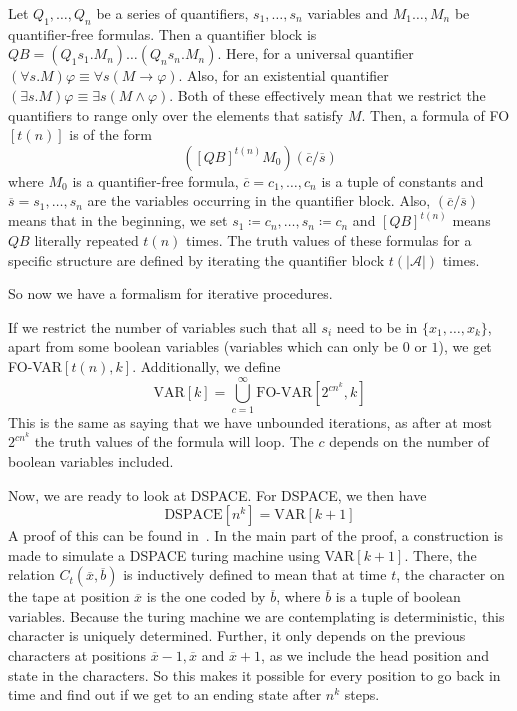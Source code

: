 \begin{define}[{FO$[t(n)]$}]
    Let $Q_1, \dots, Q_n$ be a series of quantifiers, $s_1, \dots, s_n$ variables and $M_1 \dots, M_n$ be quantifier-free formulas.
    Then a quantifier block is $QB = (Q_{1}s_{1}.M_{n})\dots(Q_{n}s_{n}.M_{n})$.
    Here, for a universal quantifier $(\forall s.M)\varphi \equiv \forall s (M \to \varphi)$.
    Also, for an existential quantifier $(\exists s.M)\varphi \equiv \exists s(M \land \varphi)$.
    Both of these effectively mean that we restrict the quantifiers to range only over the elements that satisfy $M$.
    Then, a formula of FO$[t(n)]$ is of the form
    \[
        \left([QB]^{t(n)}M_{0}\right)(\overline{c} / \overline{s})
    \]
    where $M_0$ is a quantifier-free formula, $\overline{c} = c_1, \dots, c_n$ is a tuple of constants and $\overline{s} = s_1, \dots, s_n$ are the variables occurring in the quantifier block.
    Also, $(\overline{c} / \overline{s})$ means that in the beginning, we set $s_1 \coloneqq c_n, \dots, s_n \coloneqq c_n$ and $[QB]^{t(n)}$ means $QB$ literally repeated $t(n)$ times.
    The truth values of these formulas for a specific structure are defined by iterating the quantifier block $t(|\mathcal{A}|)$ times.
\end{define}
So now we have a formalism for iterative procedures.

If we restrict the number of variables such that all $s_i$ need to be in $\{x_1, \dots, x_k \}$, apart from some boolean variables (variables which can only be $0$ or $1$), we get FO-VAR$[t(n), k]$.
Additionally, we define
\[
    \text{VAR}[k] = \bigcup_{c = 1}^{\infty}\text{FO-VAR}[2^{cn^k}, k]
\]
This is the same as saying that we have unbounded iterations, as after at most $2^{cn^k}$ the truth values of the formula will loop.
The $c$ depends on the number of boolean variables included.

Now, we are ready to look at DSPACE\@.
For DSPACE, we then have
\[
    \text{DSPACE}[n^k] = \text{VAR}[k + 1]
\]
A proof of this can be found in~\cite{descriptive-complexity}.
In the main part of the proof, a construction is made to simulate a DSPACE turing machine using VAR$[k + 1]$.
There, the relation $C_{t}(\overline{x}, \overline{b})$ is inductively defined to mean that at time $t$, the character on the tape at position $\overline{x}$ is the one coded by $\overline{b}$, where $\overline{b}$ is a tuple of boolean variables.
Because the turing machine we are contemplating is deterministic, this character is uniquely determined.
Further, it only depends on the previous characters at positions $\overline{x} - 1, \overline{x}$ and $\overline{x} + 1$, as we include the head position and state in the characters.
So this makes it possible for every position to go back in time and find out if we get to an ending state after $n^k$ steps.

